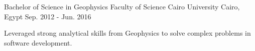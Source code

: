 

\begin{cventries}

  \cventry
    {Bachelor of Science in Geophysics} %
    {Faculty of Science Cairo University} %
    {Cairo, Egypt} %
    {Sep. 2012 - Jun. 2016} %
    {
      \begin{cvitems} %
            \item {Leveraged strong analytical skills from Geophysics to solve complex problems in software development.}
      \end{cvitems}
    }

\end{cventries}
